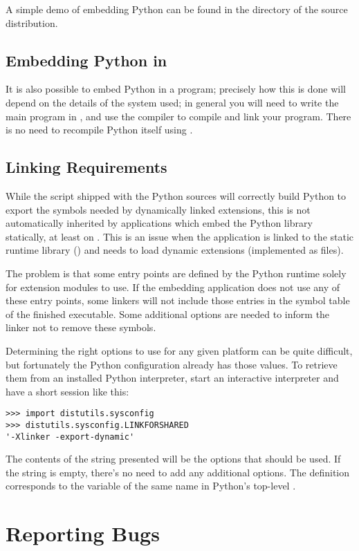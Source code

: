 \documentclass{manual}
\begin{document}
A simple demo of embedding Python can be found in the directory
 of the source distribution.


\section{Embedding Python in \Cpp{}
         \label{embeddingInCplusplus}}

It is also possible to embed Python in a \Cpp{} program; precisely how this
is done will depend on the details of the \Cpp{} system used; in general you
will need to write the main program in \Cpp{}, and use the \Cpp{} compiler
to compile and link your program.  There is no need to recompile Python
itself using \Cpp{}.


\section{Linking Requirements
         \label{link-reqs}}

While the  script shipped with the Python sources
will correctly build Python to export the symbols needed by
dynamically linked extensions, this is not automatically inherited by
applications which embed the Python library statically, at least on
\UNIX.  This is an issue when the application is linked to the static
runtime library () and needs to load dynamic
extensions (implemented as  files).

The problem is that some entry points are defined by the Python
runtime solely for extension modules to use.  If the embedding
application does not use any of these entry points, some linkers will
not include those entries in the symbol table of the finished
executable.  Some additional options are needed to inform the linker
not to remove these symbols.

Determining the right options to use for any given platform can be
quite difficult, but fortunately the Python configuration already has
those values.  To retrieve them from an installed Python interpreter,
start an interactive interpreter and have a short session like this:

\begin{verbatim}
>>> import distutils.sysconfig
>>> distutils.sysconfig.LINKFORSHARED 
'-Xlinker -export-dynamic'
\end{verbatim}

The contents of the string presented will be the options that should
be used.  If the string is empty, there's no need to add any
additional options.  The  definition
corresponds to the variable of the same name in Python's top-level
.


\appendix
\chapter{Reporting Bugs}

\end{document}

